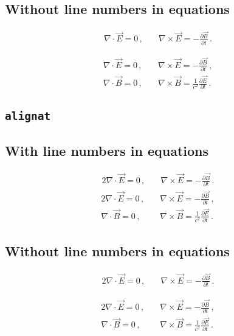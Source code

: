 \documentclass{ltxdoc}
\begin{document}
\subsection*{Without line numbers in equations}
\nextlipsum
\begin{linenomath*}
\begin{align*}
  \nabla \cdot \vec E = 0 \,, &\quad \nabla \times \vec E = - \frac{\partial \vec B}{\partial t} \,.
\end{align*}
\end{linenomath*}
\nextlipsum
\begin{linenomath*}
\begin{align*}
  \nabla \cdot \vec E = 0 \,, &\quad \nabla \times \vec E = - \frac{\partial \vec B}{\partial t} \,, \\
  \nabla \cdot \vec B = 0 \,, &\quad \nabla \times \vec B = \frac{1}{c^2} \frac{\partial \vec E}{\partial t} \,.
\end{align*}
\end{linenomath*}
\nextlipsum

\subsection*{\texttt{alignat}}

\subsection*{With line numbers in equations}
\nextlipsum
\begin{alignat}{2}
  \nabla \cdot \vec E = 0 \,, &\quad \nabla \times \vec E = - \frac{\partial \vec B}{\partial t} \,.
\end{alignat}
\nextlipsum
\begin{alignat}{2}
  \nabla \cdot \vec E = 0 \,, &\quad \nabla \times \vec E = - \frac{\partial \vec B}{\partial t} \,, \\
  \nabla \cdot \vec B = 0 \,, &\quad \nabla \times \vec B = \frac{1}{c^2} \frac{\partial \vec E}{\partial t} \,.
\end{alignat}
\nextlipsum

\subsection*{Without line numbers in equations}
\nextlipsum
\begin{linenomath*}
\begin{alignat}{2}
  \nabla \cdot \vec E = 0 \,, &\quad \nabla \times \vec E = - \frac{\partial \vec B}{\partial t} \,.
\end{alignat}
\end{linenomath*}
\nextlipsum
\begin{linenomath*}
\begin{alignat}{2}
  \nabla \cdot \vec E = 0 \,, &\quad \nabla \times \vec E = - \frac{\partial \vec B}{\partial t} \,, \\
  \nabla \cdot \vec B = 0 \,, &\quad \nabla \times \vec B = \frac{1}{c^2} \frac{\partial \vec E}{\partial t} \,.
\end{alignat}
\end{linenomath*}
\nextlipsum
\end{document}
